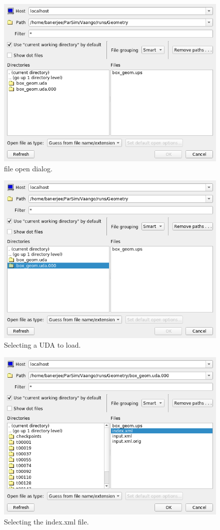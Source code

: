 \begin{paracol}{2}
  \switchcolumn
  \begin{figure}[htb!]
    \centering
    \includegraphics[width=0.5\columnwidth]{FIGS/visit/visit_3.png}
    \caption{\Visit file open dialog.}
    \label{fig:visit_3}
  \end{figure}

  \begin{figure}[htb!]
    \centering
    \includegraphics[width=0.5\columnwidth]{FIGS/visit/visit_4.png}
    \caption{Selecting a UDA to load.}
    \label{fig:visit_4}
  \end{figure}

  \switchcolumn
  \begin{figure}[htb!]
    \centering
    \includegraphics[width=\columnwidth]{FIGS/visit/visit_6.png}
    \caption{Selecting the index.xml file.}
    \label{fig:visit_6}
  \end{figure}


\end{paracol}
